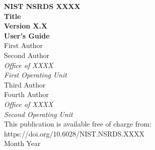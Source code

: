 \documentclass[12pt]{article}
\newcommand{\pubnumber}{XXXX}
\newcommand{\DOI}{https://doi.org/10.6028/NIST.NSRDS.XXXX}
\newcommand{\monthyear}{Month Year}
\begin{document}
\begin{titlepage}
\begin{flushright}
\LARGE{\textbf{NIST NSRDS \pubnumber}}\\
\vfill
\Huge{\textbf{Title}}\\
\Large{\textbf{Version X.X}}\\
\Large{\textbf{User's Guide}}\\
\vfill
\normalsize First Author\\
Second Author\\
\textit{Office of XXXX}\\
\textit{First Operating Unit}\\
\vspace{12pt}
Third Author\\
Fourth Author\\
\textit{Office of XXXX}\\
\textit{Second Operating Unit}\\
\vfill
\normalsize This publication is available free of charge from:\\
\DOI\\
\vfill
\normalsize \monthyear
\vfill


\end{flushright}
\end{titlepage}
\end{document}
